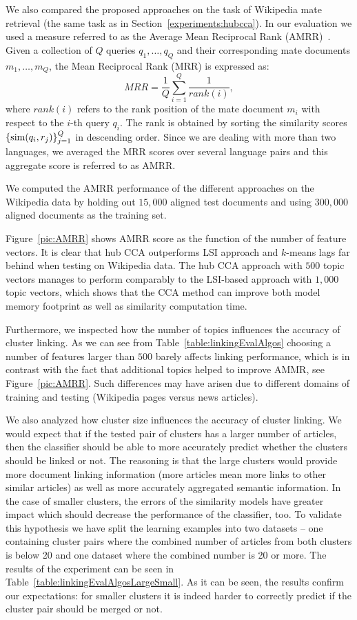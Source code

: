 We also compared the proposed approaches on the task of Wikipedia mate retrieval (the same task as in Section~\ref{experiments:hubcca}).
In our evaluation we used a measure referred to as
the Average Mean Reciprocal Rank (AMRR)~\cite{voorhees1999trec}. Given a collection of $Q$ queries $q_1,\ldots,q_Q$ and
their corresponding mate documents $m_1,\ldots,m_Q$, the Mean Reciprocal Rank (MRR) is expressed as:
$$ MRR = \frac{1}{Q}\sum_{i=1}^Q \frac{1}{rank(i)},$$
where $rank(i)$ refers to the rank position of the mate document $m_i$ with respect to the $i$-th query $q_i$.
The rank is obtained by sorting the similarity scores $\lbrace \textnormal{sim}(q_i,r_j)\rbrace_{j=1}^Q$ in descending order.
Since we are dealing with more than two languages, we averaged the MRR scores over several language pairs and
this aggregate score is referred to as AMRR.

We computed the AMRR performance of the different approaches on the Wikipedia data by holding out $15,000$
aligned test documents and using $300,000$ aligned documents as the training set.

Figure~\ref{pic:AMRR} shows AMRR score as the function of the number of feature vectors.
It is clear that hub CCA outperforms LSI approach and $k$-means lags far behind when testing on Wikipedia data.
The hub CCA approach with $500$ topic vectors manages to perform comparably
to the LSI-based approach with $1,000$ topic vectors, which shows that the CCA
method can improve both model memory footprint as well as similarity computation time.

Furthermore, we inspected how the number of topics influences the accuracy of cluster linking.
As we can see from Table~\ref{table:linkingEvalAlgos} choosing a number of features larger
than $500$ barely affects linking performance, which is in contrast with the fact that additional
topics helped to improve AMMR, see Figure~\ref{pic:AMRR}. Such differences may have arisen
due to different domains of training and testing (Wikipedia pages versus news articles).

We also analyzed how cluster size influences the accuracy of cluster linking. We would
expect that if the tested pair of clusters has a larger number of articles, then the
classifier should be able to more accurately predict whether the clusters should be linked
or not. The reasoning is that the large clusters would provide more document linking information
(more articles mean more links to other similar articles) as well as more accurately aggregated
semantic information. In the case of smaller clusters, the errors of the similarity models have
greater impact which should decrease the performance of the classifier, too. To validate this
hypothesis we have split the learning examples into two datasets -- one containing cluster
pairs where the combined number of articles from both clusters is below 20 and one dataset
where the combined number is 20 or more. The results of the experiment can be seen in
Table~\ref{table:linkingEvalAlgosLargeSmall}. As it can be seen, the results confirm our
expectations: for smaller clusters it is indeed harder to correctly predict if the cluster
pair should be merged or not.

